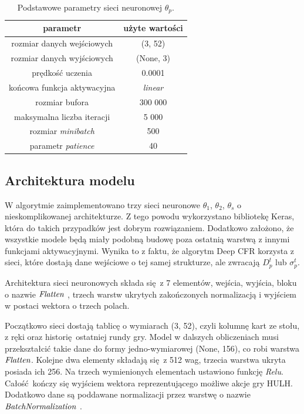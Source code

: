 \documentclass[12pt,oneside,a4paper]{report}
\begin{document}
\begin{table}[h!]
\centering
\caption{Podstawowe parametry sieci neuronowej $\theta_{p}$.}
\begin{tabular}{|c|c| }
   \hline
   parametr & użyte wartości \\
    \hline
   rozmiar danych wejściowych & (3, 52) \\
   \hline
   rozmiar danych wyjściowych & (None, 3) \\  
   \hline
   prędkość uczenia & 0.0001 \\
   \hline
   końcowa funkcja aktywacyjna & \emph{linear} \\
   \hline
   rozmiar bufora & 300 000 \\
   \hline
   maksymalna liczba iteracji & 5 000 \\
   \hline
   rozmiar \emph{minibatch} &  500\\
   \hline
   parametr \emph{patience} &  40\\
   \hline
\end{tabular}
\end{table}

\vspace{5cm}
\subsection{Architektura modelu}

W algorytmie zaimplementowano trzy sieci neuronowe $\theta_{1}$, $\theta_{2}$, $\theta_{s}$ o nieskomplikowanej architekturze. Z tego powodu
wykorzystano bibliotekę Keras, która do takich przypadków jest dobrym rozwiązaniem. 
Dodatkowo
założono, że
wszystkie modele będą miały podobną budowę poza ostatnią warstwą z innymi funkcjami
aktywacyjnymi. Wynika to z faktu, że algorytm Deep CFR korzysta z sieci, które dostają dane wejściowe
o tej samej strukturze, ale zwracają $D_{p}^{t}$ lub $\sigma_{p}^{t}$.

Architektura sieci neuronowych składa się z 7 elementów, wejścia, wyjścia, bloku o nazwie
$\emph{Flatten}$ \cite{tensorflow}, 
trzech warstw ukrytych zakończonych normalizacją i wyjściem w postaci wektora o trzech polach.


Początkowo sieci dostają tablicę o wymiarach (3, 52), czyli kolumnę kart ze stołu, z ręki oraz
historię ostatniej rundy gry. Model w dalszych obliczeniach musi
przekształcić takie dane do formy jedno-wymiarowej (None, 156), co robi warstwa $\emph{Flatten}$.
Kolejne dwa elementy składają się z 512 wag, trzecia warstwa ukryta posiada ich 256.
Na trzech wymienionych elementach ustawiono funkcję \emph{Relu}.
Całość kończy się wyjściem wektora reprezentującego możliwe akcje gry HULH.
Dodatkowo dane są poddawane normalizacji przez warstwę o nazwie $\emph{BatchNormalization}$
\cite{tensorflow}.
\end{document}
